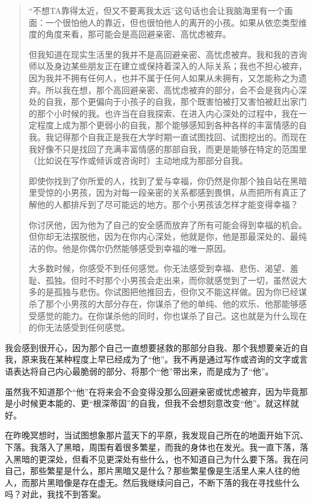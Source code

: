 \blockquote{
“不想TA靠得太近，但又不要离我太远”这句话也会让我脑海里有一个画面：一个很怕他人的靠近，但也很怕他人的离开的小孩。如果从依恋类型维度的角度来看，那可能会是高回避亲密、高忧虑被弃。

但我知道在现实生活里的我并不是高回避亲密、高忧虑被弃。我和我的咨询师以及身边某些朋友正在建立或保持着深入的人际关系；我也不担心被弃，因为我并不拥有任何人，也并不属于任何人\pozhehao{}如果从未拥有，又怎能称之为遗弃。所以我在想，那个高回避亲密、高忧虑被弃的部分，会不会是我内心深处的自我，那个更偏向于小孩子的自我，那个既害怕被打又害怕被赶出家门的那个小时候的我。也许当在自我探索、在进入内心深处的过程中，我在一定程度上成为那个更弱小的自我，那个能够感知到各种各样的丰富情感的自我。我记得那个自我正是我在大学时期一直试图找回、试图挖出的。而现在我好像不只是找回了充满丰富情感的那部自我，而更是能够在特定的范围里（比如说在写作或倾诉或咨询时）主动地成为那部分自我。

即使你找到了你所爱的人，找到了爱与幸福，你仍然是你\pozhehao{}那个独自站在黑暗里受惊的小男孩，因为对每一段亲密的关系都感到畏惧，从而把所有真正了解他的人都排斥到了尽可能远的地方。那个小男孩该怎样才能变得幸福？

你讨厌他，因为他为了自己的安全感而放弃了所有可能会得到幸福的机会。但你却无法摆脱他，因为在你内心深处，他就是你，他是那最深处的、最纯洁的你。他是你偶尔仍然能够感受到幸福的唯一原因。

大多数时候，你感受不到任何感觉。你无法感受到幸福、悲伤、渴望、羞耻、孤独。但时不时那个小男孩会走出来，而你就感觉到了一切，虽然说大多的是孤独与悲伤。你试图把他推回去，但你又不能这样做。因为你已经谋杀了那个小男孩的大部分存在，你谋杀了他的单纯、他的欢乐、他那能够感受感觉的能力。在你谋杀他的同时，你也谋杀了自己。这也就是为什么现在的你无法感受到任何感觉。

}


\tristarsepline

我会感到很开心，因为那个自己一直想要拯救的那部分自我、那个我想要亲近的自我，原来我在某种程度上早已经成为了“他”。我不再是通过写作或咨询的文字或言语表达将自己内心最脆弱的部分、将那个“他”带出来，而是成为了“他”。

虽然我不知道那个“他”在将来会不会变得没那么回避亲密或忧虑被弃，因为毕竟那是小时候更本能的、更“根深蒂固”的自我，但我不会想刻意改变“他”。就这样就好。

\tristarsepline

在昨晚冥想时，当试图想象那片蓝天下的平原，我发现自己所在的地面开始下沉、下落。我落入了黑暗，周围有着很多繁星，而我的身体也在发光。我一直下落，落入黑暗的更深处，但看不见更深处有些什么，也不知道自己为什么要下落。我在问自己，那些繁星是什么，那片黑暗又是什么？那些繁星像是生活里人来人往的他人，而那片黑暗像是存在虚无。然后我继续问自己，不断下落的我在寻找些什么吗？对此，我找不到答案。

